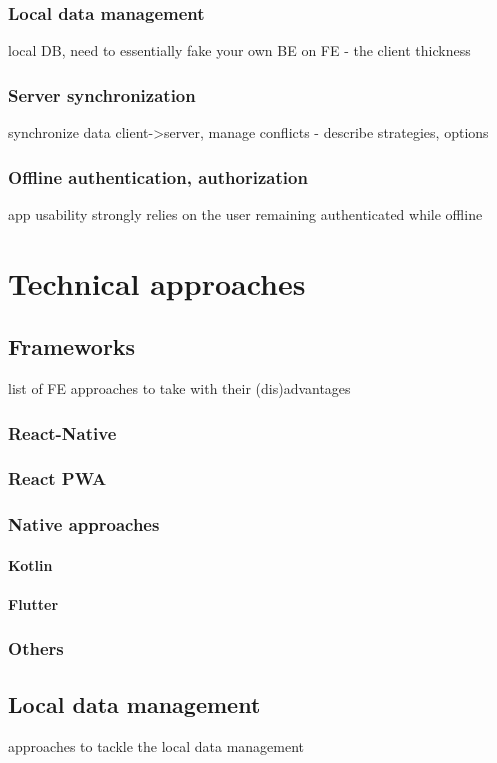 \documentclass[
  digital,     %
  color,       %
  oneside,     %
  nosansbold,  %
  nocolorbold, %
  lof,         %
  lot,         %
]{fithesis4}
\begin{document}
\subsection{Local data management}
local DB, need to essentially fake your own BE on FE - the client thickness
\subsection{Server synchronization}
synchronize data client->server, manage conflicts - describe strategies, options
\subsection{Offline authentication, authorization}
app usability strongly relies on the user remaining authenticated while offline

\chapter{Technical approaches}
\section{Frameworks}
list of FE approaches to take with their (dis)advantages
\subsection{React-Native}
\subsection{React PWA}
\subsection{Native approaches}
\subsubsection{Kotlin}
\subsubsection{Flutter}
\subsection{Others}
\section{Local data management}
approaches to tackle the local data management
\end{document}

